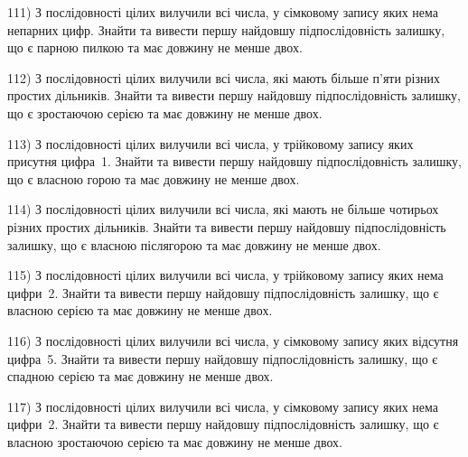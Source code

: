 \documentclass[12pt, ukrainian]{article}
\begin{document}
\par
\newpage
111) \space 
З послідовності цілих вилучили всі числа, у сімковому запису яких нема непарних цифр. Знайти та вивести першу найдовшу підпослідовність залишку, що є парною пилкою та має довжину не менше двох.

\par
\vspace{0.9cm}
112) \space 
З послідовності цілих вилучили всі числа, які мають більше п'яти різних простих дільників. Знайти та вивести першу найдовшу підпослідовність залишку, що є зростаючою серією та має довжину не менше двох.

\par
\vspace{0.9cm}
113) \space 
З послідовності цілих вилучили всі числа, у трійковому запису яких присутня цифра~1. Знайти та вивести першу найдовшу підпослідовність залишку, що є власною горою та має довжину не менше двох.

\par
\vspace{0.9cm}
114) \space 
З послідовності цілих вилучили всі числа, які мають не більше чотирьох різних простих дільників. Знайти та вивести першу найдовшу підпослідовність залишку, що є власною післягорою та має довжину не менше двох.

\par
\vspace{0.9cm}
115) \space 
З послідовності цілих вилучили всі числа, у трійковому запису яких нема цифри~2. Знайти та вивести першу найдовшу підпослідовність залишку, що є власною серією та має довжину не менше двох.

\par
\vspace{0.9cm}
116) \space 
З послідовності цілих вилучили всі числа, у сімковому запису яких відсутня цифра~5. Знайти та вивести першу найдовшу підпослідовність залишку, що є спадною серією та має довжину не менше двох.

\par
\vspace{0.9cm}
117) \space 
З послідовності цілих вилучили всі числа, у сімковому запису яких нема цифри~2. Знайти та вивести першу найдовшу підпослідовність залишку, що є власною зростаючою серією та має довжину не менше двох.
\end{document}
